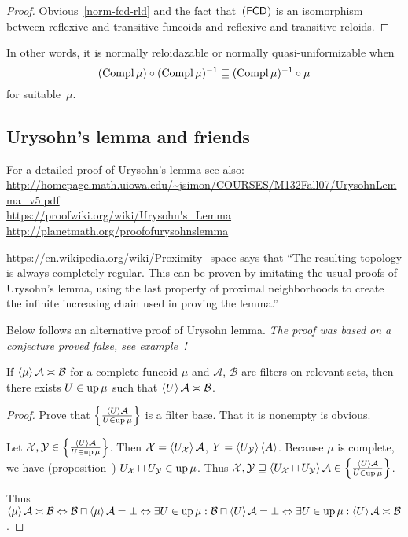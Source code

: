 \begin{proof}
Obvious~\ref{norm-fcd-rld} and the fact that~$(\mathsf{FCD})$ is an isomorphism between reflexive and transitive funcoids
and reflexive and transitive reloids.
\end{proof}

In other words, it is normally reloidazable or normally quasi-uniformizable when
\[ (\operatorname{Compl}\mu)\circ(\operatorname{Compl}\mu)^{-1}\sqsubseteq(\operatorname{Compl}\mu)^{-1}\circ\mu \]
for suitable~$\mu$.

\subsection{Urysohn's lemma and friends}

For a detailed proof of Urysohn's lemma see also:\\
\url{http://homepage.math.uiowa.edu/~jsimon/COURSES/M132Fall07/UrysohnLemma_v5.pdf}\\
\url{https://proofwiki.org/wiki/Urysohn's_Lemma}\\
\url{http://planetmath.org/proofofurysohnslemma}

\url{https://en.wikipedia.org/wiki/Proximity_space} says that
``The resulting topology is always completely regular. This can be proven by imitating the usual proofs of Urysohn's lemma, using the last property of proximal neighborhoods to create the infinite increasing chain used in proving the lemma.''

Below follows an alternative proof of Urysohn lemma.
\emph{The proof was based on a conjecture proved false, see example~!}

\begin{lem}
  If $\left\langle \mu\right\rangle \mathcal{A} \asymp \mathcal{B}$ for a complete
  funcoid $\mu$ and $\mathcal{A}$, $\mathcal{B}$ are filters on relevant
  sets, then there exists $U \in \operatorname{up} \mu$ such that $\left\langle U\right\rangle \mathcal{A} \asymp \mathcal{B}$.
\end{lem}

\begin{proof}
  Prove that $\left\{ \frac{ \left\langle U\right\rangle \mathcal{A} }{
  U \in \operatorname{up} \mu }\right\}$ is a filter base. That it
  is nonempty is obvious.
  
  Let $\mathcal{X}, \mathcal{Y} \in \left\{ \frac{ \left\langle U\right\rangle \mathcal{A}
  }{ U \in \operatorname{up} \mu }\right\}$. Then
  $\mathcal{X} = \left\langle U_{\mathcal{X}}\right\rangle \mathcal{A}$, $Y = \left\langle 
  U_{\mathcal{Y}}\right\rangle \left\langle A\right\rangle$. Because $\mu$ is complete, we have
  (proposition~) $U_{\mathcal{X}} \sqcap U_{\mathcal{Y}} \in \operatorname{up}
  \mu$. Thus $\mathcal{X}, \mathcal{Y} \sqsupseteq \left\langle 
  U_{\mathcal{X}} \sqcap U_{\mathcal{Y}} \right\rangle \mathcal{A} \in \left\{ \frac{
  \left\langle U\right\rangle \mathcal{A} }{ U \in \operatorname{up} \mu }\right\}$.
  
  Thus $\left\langle \mu\right\rangle \mathcal{A} \asymp \mathcal{B}
  \Leftrightarrow \mathcal{B} \sqcap \left\langle \mu\right\rangle \mathcal{A} =
  \bot \Leftrightarrow \exists U \in \operatorname{up} \mu: \mathcal{B} \sqcap
  \left\langle U\right\rangle \mathcal{A} = \bot \Leftrightarrow \exists U \in \operatorname{up}
  \mu: \left\langle U\right\rangle \mathcal{A} \asymp \mathcal{B}$.
\end{proof}

